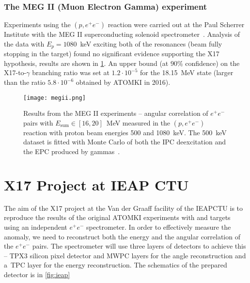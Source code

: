 			\subsubsection{The MEG II (Muon Electron Gamma) experiment}
				Experiments using the $(p,e^+e^-)$ reaction were carried out at the Paul Scherrer Institute with the MEG II superconducting solenoid spectrometer~\cite{megii}. Analysis of the data with $E_p = 1080$~keV exciting both of the resonances (beam fully stopping in the target) found no significant evidence supporting the X17 hypothesis, results are shown in \cref{fig:megii}. An upper bound (at 90\% confidence) on the X17\nobreakdash-to\nobreakdash-$\gamma$ branching ratio was set at $1.2\cdot10^{-5}$ for the 18.15~MeV state (larger than the ratio $5.8\cdot10^{-6}$ obtained by ATOMKI in 2016).
				
				\begin{figure}
					\centering
					\texttt{[image: megii.png]}
					\caption{Results from the MEG II experiments -- angular correlation of $e^+e^-$ pairs with $E_\text{sum} \in [16,20]$~MeV measured in the $(p,e^+e^-)$ reaction with proton beam energies 500 and 1080~keV. The 500~keV dataset is fitted with Monte Carlo of both the \ac{IPC} deexcitation and the \ac{EPC} produced by gammas~\cite{megii}.}
					\label{fig:megii}
				\end{figure}
			
	
	\section{X17 Project at IEAP CTU}
	\label{sec:IEAP}
		The aim of the X17 project at the Van der Graaff facility of the \acl{IEAPCTU} is to reproduce the results of the original ATOMKI experiments with  and  targets using an independent $e^+e^-$ spectrometer. In order to effectively measure the anomaly, we need to reconstruct both the energy and the angular correlation of the $e^+e^-$ pairs. The spectrometer will use three layers of detectors to achieve this -- \acf{TPX3} silicon pixel detector and \acf{MWPC} layers for the angle reconstruction and a~\acf{TPC} layer for the energy reconstruction. The schematics of the prepared detector is in \cref{fig:ieap}
			
